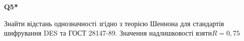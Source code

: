 \documentclass{../../test-template}
\begin{document}
\begin{tcolorbox}[lowerbox=invisible,colback=white]
    \begin{minipage}{0.1\textwidth}
        \raggedright
        \vspace*{\fill}
            \textbf{Q5*}
        \vspace*{\fill}
        \end{minipage}
        \begin{minipage}{0.75\textwidth}
        Знайти відстань однозначності згідно з теорією Шеннона для стандартів шифрування DES та ГОСТ 28147-89. Значення надлишковості взяти$R=0,75$
        \end{minipage}
\end{tcolorbox}
\end{document}
